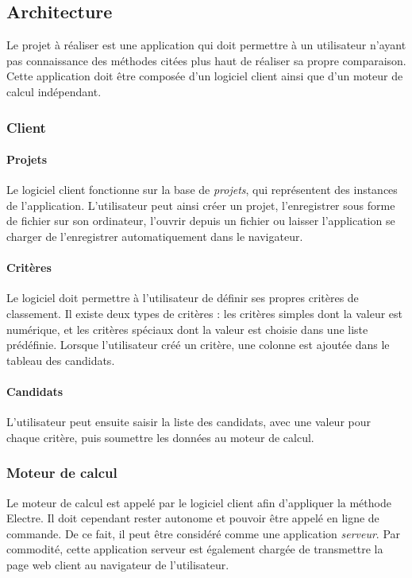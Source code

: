 \documentclass[a4paper]{article}
\begin{document}
\subsection{Architecture}

Le projet à réaliser est une application qui doit permettre à un utilisateur n'ayant pas connaissance des méthodes citées plus haut de réaliser sa propre comparaison. Cette application doit être composée d'un logiciel client ainsi que d'un moteur de calcul indépendant.

\subsubsection{Client}

\paragraph{Projets} Le logiciel client fonctionne sur la base de \textit{projets}, qui représentent des instances de l'application. L'utilisateur peut ainsi créer un projet, l'enregistrer sous forme de fichier sur son ordinateur, l'ouvrir depuis un fichier ou laisser l'application se charger de l'enregistrer automatiquement dans le navigateur.

\paragraph{Critères} Le logiciel doit permettre à l'utilisateur de définir ses propres critères de classement. Il existe deux types de critères : les critères simples dont la valeur est numérique, et les critères spéciaux dont la valeur est choisie dans une liste prédéfinie. Lorsque l'utilisateur créé un critère, une colonne est ajoutée dans le tableau des candidats.

\paragraph{Candidats} L'utilisateur peut ensuite saisir la liste des candidats, avec une valeur pour chaque critère, puis soumettre les données au moteur de calcul.

\subsubsection{Moteur de calcul}

Le moteur de calcul est appelé par le logiciel client afin d'appliquer la méthode Electre. Il doit cependant rester autonome et pouvoir être appelé en ligne de commande. De ce fait, il peut être considéré comme une application \textit{serveur}. Par commodité, cette application serveur est également chargée de transmettre la page web client au navigateur de l'utilisateur.
\end{document}
